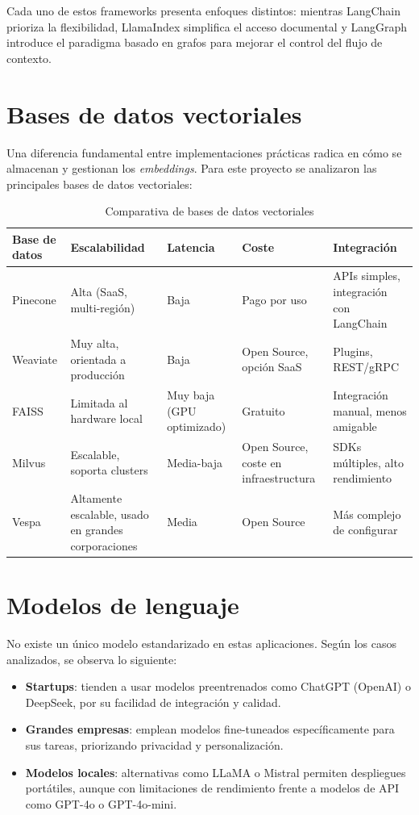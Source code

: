 Cada uno de estos frameworks presenta enfoques distintos: mientras LangChain prioriza la flexibilidad, LlamaIndex simplifica el acceso documental y LangGraph introduce el paradigma basado en grafos para mejorar el control del flujo de contexto.

\section{Bases de datos vectoriales}
Una diferencia fundamental entre implementaciones prácticas radica en cómo se almacenan y gestionan los \textit{embeddings}. Para este proyecto se analizaron las principales bases de datos vectoriales:

\begin{table}[H]
\centering
\caption{Comparativa de bases de datos vectoriales}
\label{tab:vectorDB}
\begin{tabular}{|p{3cm}|p{3cm}|p{3cm}|p{3cm}|p{3cm}|}
\hline
\textbf{Base de datos} & \textbf{Escalabilidad} & \textbf{Latencia} & \textbf{Coste} & \textbf{Integración} \\ \hline
Pinecone & Alta (SaaS, multi-región) & Baja & Pago por uso & APIs simples, integración con LangChain \\ \hline
Weaviate & Muy alta, orientada a producción & Baja & Open Source, opción SaaS & Plugins, REST/gRPC \\ \hline
FAISS & Limitada al hardware local & Muy baja (GPU optimizado) & Gratuito & Integración manual, menos amigable \\ \hline
Milvus & Escalable, soporta clusters & Media-baja & Open Source, coste en infraestructura & SDKs múltiples, alto rendimiento \\ \hline
Vespa & Altamente escalable, usado en grandes corporaciones & Media & Open Source & Más complejo de configurar \\ \hline
\end{tabular}
\end{table}

\section{Modelos de lenguaje}
No existe un único modelo estandarizado en estas aplicaciones. Según los casos analizados, se observa lo siguiente:

\begin{itemize}
    \item \textbf{Startups}: tienden a usar modelos preentrenados como ChatGPT (OpenAI) o DeepSeek, por su facilidad de integración y calidad.
    \item \textbf{Grandes empresas}: emplean modelos fine-tuneados específicamente para sus tareas, priorizando privacidad y personalización.
    \item \textbf{Modelos locales}: alternativas como LLaMA o Mistral permiten despliegues portátiles, aunque con limitaciones de rendimiento frente a modelos de API como GPT-4o o GPT-4o-mini.
\end{itemize}

